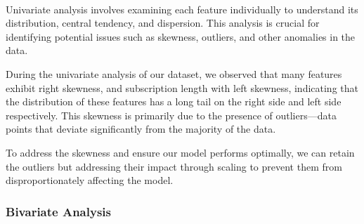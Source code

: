 \documentclass[11pt]{article}
\begin{document}
    \begin{center}
    \end{center}
    { \hspace*{\fill} \\}
    
    Univariate analysis involves examining each feature individually to
understand its distribution, central tendency, and dispersion. This
analysis is crucial for identifying potential issues such as skewness,
outliers, and other anomalies in the data.

During the univariate analysis of our dataset, we observed that many
features exhibit right skewness, and subscription length with left
skewness, indicating that the distribution of these features has a long
tail on the right side and left side respectively. This skewness is
primarily due to the presence of outliers---data points that deviate
significantly from the majority of the data.

To address the skewness and ensure our model performs optimally, we can
retain the outliers but addressing their impact through scaling to
prevent them from disproportionately affecting the model.

    \subsubsection{Bivariate Analysis}\label{bivariate-analysis}
\end{document}
